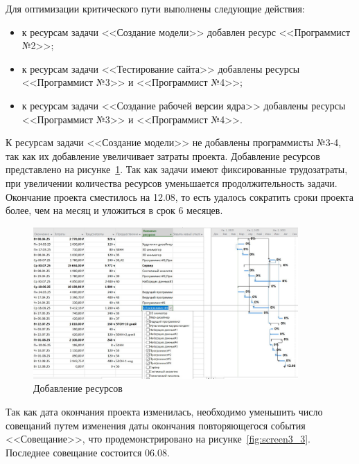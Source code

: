 Для оптимизации критического пути выполнены следующие действия:
\begin{itemize}[label=---]
	\item к ресурсам задачи <<Создание модели>> добавлен ресурс <<Программист №2>>;
	\item к ресурсам задачи <<Тестирование сайта>> добавлены ресурсы <<Программист №3>> и <<Программист №4>>;
	\item к ресурсам задачи <<Создание рабочей версии ядра>> добавлены ресурсы <<Программист №3>> и <<Программист №4>>.
\end{itemize}

К ресурсам задачи <<Создание модели>> не добавлены программисты №3-4, так как их добавление увеличивает затраты проекта.
Добавление ресурсов представлено на рисунке~\ref{fig:screen3_2}.
Так как задачи имеют фиксированные трудозатраты, при увеличении количества ресурсов уменьшается продолжительность задачи.
Окончание проекта сместилось на 12.08, то есть удалось сократить сроки проекта более, чем на месяц и уложиться в срок 6 месяцев.

\begin{figure}[H]
	\centering
	\includegraphics[width=0.9\textwidth]{img/lab3/task3/screen2.jpg}
	\caption{Добавление ресурсов}
	\label{fig:screen3_2}
\end{figure}

Так как дата окончания проекта изменилась, необходимо уменьшить число совещаний путем изменения даты окончания повторяющегося события <<Совещание>>, что продемонстрировано на рисунке~\ref{fig:screen3_3}.
Последнее совещание состоится 06.08.

